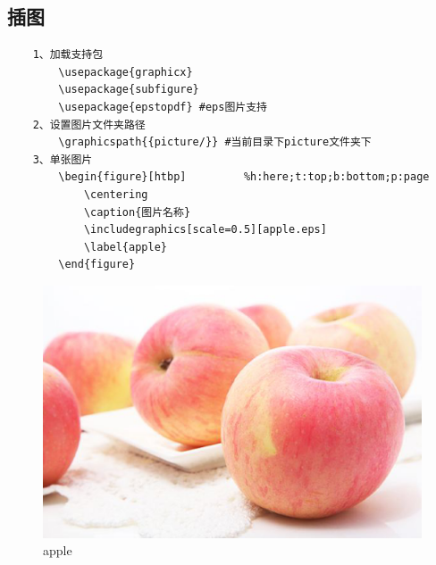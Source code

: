 \documentclass[a4paper]{article}
\begin{document}
	\subsection{插图}
	\begin{lstlisting}
	1、加载支持包
		\usepackage{graphicx}
		\usepackage{subfigure}
		\usepackage{epstopdf} #eps图片支持
	2、设置图片文件夹路径
		\graphicspath{{picture/}} #当前目录下picture文件夹下
	3、单张图片
		\begin{figure}[htbp]         %h:here;t:top;b:bottom;p:page
			\centering
			\caption{图片名称}
			\includegraphics[scale=0.5][apple.eps]
			\label{apple}
		\end{figure}
	\end{lstlisting}
	\begin{figure}[htbp]
		\centering
		\includegraphics[scale=0.2]{apple.eps}
		\caption{apple}
	\end{figure}
\end{document}

